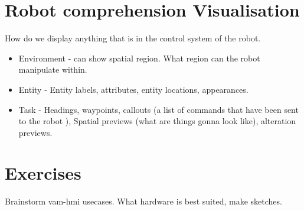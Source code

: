 \documentclass[a4paper]{article}
\begin{document}
\section{Robot comprehension Visualisation}
How do we display anything that is in the control system of the robot. 
\begin{itemize}
	\item Environment - can show spatial region. What region can the robot manipulate within. 
	\item Entity - Entity labels, attributes, entity locations, appearances. 
	\item Task - Headings, waypoints, callouts (a list of commands that have been sent to the robot ), Spatial previews (what are things gonna look like), alteration previews.  
\end{itemize}


\section{Exercises}
Brainstorm vam-hmi usecases. What hardware is best suited, make sketches. 
\end{document}
